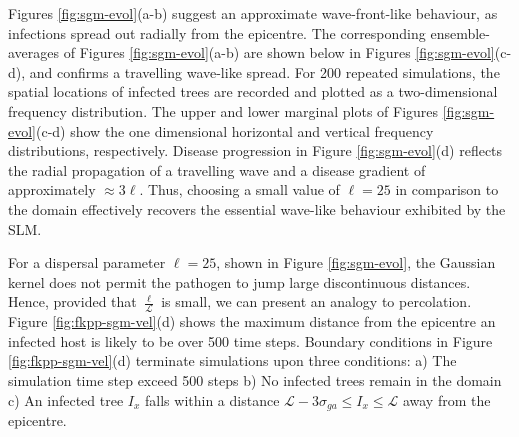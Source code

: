 Figures \ref{fig:sgm-evol}(a-b) suggest an approximate wave-front-like behaviour, as infections spread out radially from the epicentre.
The corresponding ensemble-averages of Figures \ref{fig:sgm-evol}(a-b) are shown below in Figures \ref{fig:sgm-evol}(c-d), and confirms a travelling wave-like spread.
For 200 repeated simulations, the spatial locations of infected trees are recorded and plotted as a two-dimensional frequency distribution.
The upper and lower marginal plots of Figures \ref{fig:sgm-evol}(c-d) show the one dimensional horizontal and vertical frequency distributions, respectively.
Disease progression in Figure \ref{fig:sgm-evol}(d) reflects the radial propagation of a travelling wave and a disease gradient of approximately $\approx 3\ell$.
Thus, choosing a small value of $\ell=25$ in comparison to the domain effectively recovers the essential wave-like behaviour exhibited by the SLM.

For a dispersal parameter $\ell=25$, shown in Figure \ref{fig:sgm-evol}, the Gaussian kernel does not permit the pathogen to jump large discontinuous distances.
Hence, provided that $\frac{\ell}{\mathcal{L}}$ is small, we can present an analogy to percolation.
Figure \ref{fig:fkpp-sgm-vel}(d) shows the maximum distance from the epicentre an infected host is likely to be over 500 time steps.
Boundary conditions in Figure \ref{fig:fkpp-sgm-vel}(d) terminate simulations upon three conditions: 
a) The simulation time step exceed 500 steps 
b) No infected trees remain in the domain 
c) An infected tree $I_{x}$ falls within a distance $\mathcal{L} - 3\sigma_{ga} \leq I_{x} \leq \mathcal{L}$ away from the epicentre.
    
